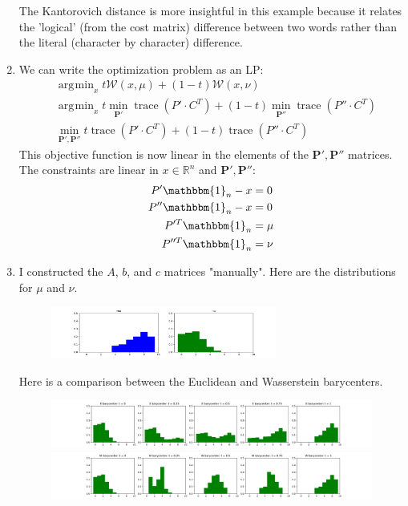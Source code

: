 \documentclass[11pt]{article}
\DeclareMathOperator*{\argmin}{arg\!min}
\DeclareMathOperator*{\trace}{trace}
\begin{document}
\begin{solution}
\begin{enumerate}
The Kantorovich distance is more insightful in this example because it relates the 'logical' (from the cost matrix) difference between two words rather than the literal (character by character) difference.

\item We can write the optimization problem as an LP:
\begin{align*}
    &\argmin_{x} t \mathcal{W}(x,\mu) + (1-t)\mathcal{W}(x,\nu) \\
    &\argmin_{x} t \min_{\mathbf{P'}} \trace(P' \cdot C^T) + (1-t) \min_{\mathbf{P''}} \trace(P'' \cdot C^T) \\
    &\min_{\mathbf{P'},\mathbf{P''}} t \trace(P' \cdot C^T) + (1-t) \trace(P'' \cdot C^T)
\end{align*}
This objective function is now linear in the elements of the $\mathbf{P'},\mathbf{P''}$ matrices. The constraints are linear in $x \in \mathbb{R}^n$ and $\mathbf{P'}, \mathbf{P''}$:
\begin{align*}
    P' \mathbbm{1}_n - x &= 0 \\
    P'' \mathbbm{1}_n - x &= 0 \\
    P'^T \mathbbm{1}_n &= \mu \\
    P''^T \mathbbm{1}_n &= \nu
\end{align*}

\item I constructed the $A$, $b$, and $c$ matrices "manually". Here are the distributions for $\mu$ and $\nu$.

\begin{figure}[H]
    \centerline{\includegraphics[width=0.7\textwidth]{problem1_mu_nu.png}}
\end{figure}

Here is a comparison between the Euclidean and Wasserstein barycenters.
\begin{figure}[H]
    \centerline{\includegraphics[width=\textwidth]{problem1_e_barycenter.png}}
    \centerline{\includegraphics[width=\textwidth]{problem1_w_barycenter.png}}
\end{figure}


\end{enumerate}
\end{solution}
\end{document}
